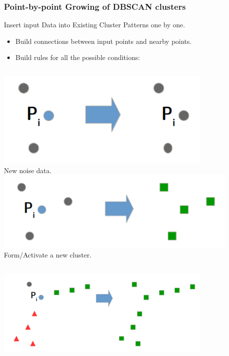 \begin{frame}
    \frametitle{Point-by-point Growing of DBSCAN clusters}
    Insert input Data into Existing Cluster Patterns one by one.
    \begin{itemize}
	    \item Build connections between input points and nearby points.
	    \item Build rules for all the possible conditions:
    \end{itemize}
    \begin{columns}
            \centering
            \includegraphics[width=0.8\textwidth]{resource/figures/condition1.png}
            \\ \tiny New noise data.
            \centering
            \includegraphics[width=0.9\textwidth]{resource/figures/condition2.png}
            \\ \tiny Form/Activate a new cluster.
    \end{columns}
        \begin{columns}
            \centering
            \includegraphics[width=0.8\textwidth]{resource/figures/condition3.png}

\end{columns}
\end{frame}
